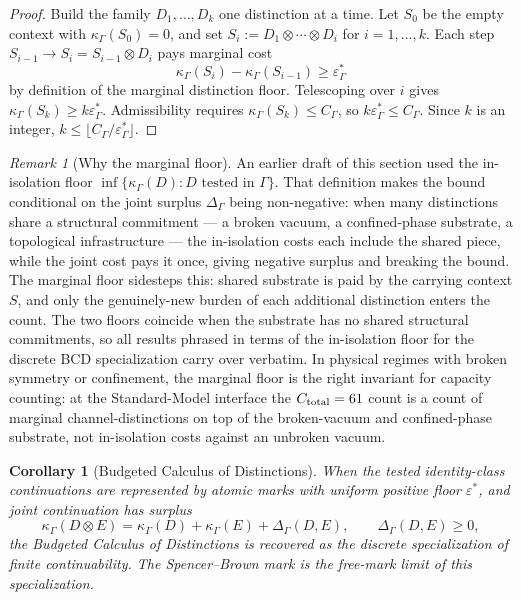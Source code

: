\documentclass[11pt]{article}
\newtheorem{corollary}[theorem]{Corollary}
\theoremstyle{remark}
\newtheorem{remark}[theorem]{Remark}
\newcommand{\G}{\Gamma}
\newcommand{\Cost}{\kappa}
\newcommand{\floor}{\varepsilon^{\!*}_{\G}}
\newcommand{\eps}{\varepsilon^{\!*}}
\begin{document}
\begin{proof}
Build the family $D_1,\ldots,D_k$ one distinction at a time.  Let $S_0$ be the empty context with $\Cost_\G(S_0)=0$, and set $S_i:=D_1\otimes\cdots\otimes D_i$ for $i=1,\ldots,k$.  Each step $S_{i-1}\to S_i = S_{i-1}\otimes D_i$ pays marginal cost
\[
        \Cost_\G(S_i)-\Cost_\G(S_{i-1})\ge \floor
\]
by definition of the marginal distinction floor.  Telescoping over $i$ gives $\Cost_\G(S_k)\ge k\floor$.  Admissibility requires $\Cost_\G(S_k)\le C_\G$, so $k\floor\le C_\G$.  Since $k$ is an integer, $k\le\lfloor C_\G/\floor\rfloor$.
\end{proof}

\begin{remark}[Why the marginal floor]
An earlier draft of this section used the in-isolation floor $\inf\{\Cost_\G(D):D\text{ tested in }\G\}$.  That definition makes the bound conditional on the joint surplus $\Delta_\G$ being non-negative: when many distinctions share a structural commitment --- a broken vacuum, a confined-phase substrate, a topological infrastructure --- the in-isolation costs each include the shared piece, while the joint cost pays it once, giving negative surplus and breaking the bound.  The marginal floor sidesteps this: shared substrate is paid by the carrying context $S$, and only the genuinely-new burden of each additional distinction enters the count.  The two floors coincide when the substrate has no shared structural commitments, so all results phrased in terms of the in-isolation floor for the discrete BCD specialization carry over verbatim.  In physical regimes with broken symmetry or confinement, the marginal floor is the right invariant for capacity counting: at the Standard-Model interface the $C_{\rm total}=61$ count is a count of marginal channel-distinctions on top of the broken-vacuum and confined-phase substrate, not in-isolation costs against an unbroken vacuum.
\end{remark}

\begin{corollary}[Budgeted Calculus of Distinctions]
When the tested identity-class continuations are represented by atomic marks with uniform positive floor \(\eps\), and joint continuation has surplus
\[
        \Cost_\G(D\otimes E)
        =
        \Cost_\G(D)+\Cost_\G(E)+\Delta_\G(D,E),
        \qquad \Delta_\G(D,E)\ge0,
\]
the Budgeted Calculus of Distinctions is recovered as the discrete specialization of finite continuability.  The Spencer--Brown mark is the free-mark limit of this specialization.
\end{corollary}
\end{document}
